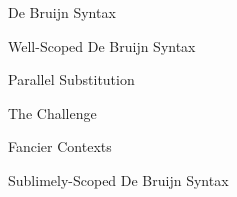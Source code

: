 \documentclass[aspectratio=43]{beamer}
\begin{document}

\begin{frame}{De Bruijn Syntax}
\end{frame}

\begin{frame}{Well-Scoped De Bruijn Syntax}
\end{frame}

\begin{frame}{Parallel Substitution}
\end{frame}

\begin{frame}{The Challenge}
\end{frame}

\begin{frame}{Fancier Contexts}
\end{frame}

\begin{frame}{Sublimely-Scoped De Bruijn Syntax}
\end{frame}
\end{document}
